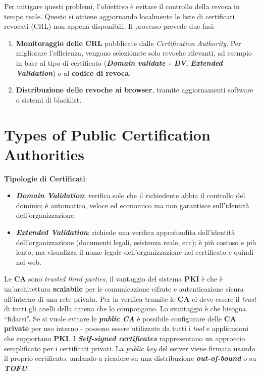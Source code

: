 \begin{flushleft}
    Per mitigare questi problemi, l'obiettivo è evitare il controllo della revoca in tempo reale. Questo si ottiene aggiornando localmente le liste di certificati revocati (CRL) non appena disponibili. Il processo prevede due fasi:
    \begin{enumerate}[nosep]
        \item \textbf{Monitoraggio delle CRL} pubblicate dalle \textit{Certification Authority}. Per migliorare l'efficienza, vengono selezionate solo revoche rilevanti, ad esempio in base al tipo di certificato (\textbf{\textit{Domain validate - DV}}, \textbf{\textit{Extended Validation}}) o al \textbf{codice di revoca}.
        \item \textbf{Distribuzione delle revoche ai browser}, tramite aggiornamenti software o sistemi di blacklist. 
    \end{enumerate}

\end{flushleft}

\section{Types of Public Certification Authorities}

\begin{flushleft}

    \textbf{Tipologie di Certificati}:
    \begin{itemize}[nosep]
        \item \textbf{\textit{Domain Validation}}: verifica solo che il richiedente abbia il controllo del dominio; è automatico, veloce ed economico ma non garantisce sull'identità dell'organizzazione.
        \item \textbf{\textit{Extended Validation}}: richiede una verifica approfondita dell'identità dell'organizzazione (documenti legali, esistenza reale, ecc); è più costoso e più lento, ma visualizza il nome legale dell'organizzazione nel certificato e quindi nel web.
    \end{itemize}

    Le \textbf{CA} sono \textit{trusted third parties}, il vantaggio del sistema \textbf{PKI} è che è un'architettura \textbf{scalabile} per le comunicazione cifrate e autenticazione sicura all'interno di una rete privata. Per la verifica tramite le \textbf{CA} ci deve essere il \textit{trust} di tutti gli anelli della catena che lo compongono. Lo svantaggio è che bisogna ``fidarsi''. Se si vuole evitare le \textbf{\textit{public CA}} è possibile configurare delle \textbf{CA private} per uso interno - possono essere utilizzate da tutti i \textit{tool} e applicazioni che supportano \textbf{PKI}. I \textbf{\textit{Self-signed certificates}} rappresentano un approccio semplificato per i certificati privati. La \textit{public key} del server viene firmata usando il proprio certificato, andando a ricadere su una distribuzione \textbf{\textit{out-of-bound}} o su \textbf{\textit{TOFU}}.

\end{flushleft}


